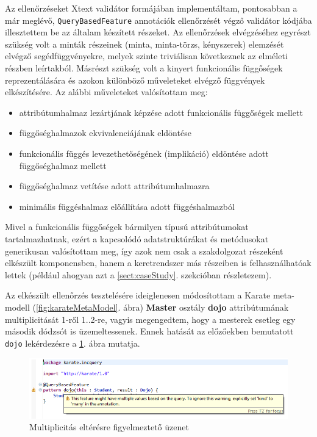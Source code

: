 Az ellenőrzéseket Xtext validátor formájában implementáltam, pontosabban a már meglévő, \texttt{QueryBasedFeature} annotációk ellenőrzését végző validátor kódjába illesztettem be az általam készített részeket.
Az ellenőrzések elvégzéséhez egyrészt szükség volt a minták részeinek (minta, minta-törzs, kényszerek) elemzését elvégző segédfüggvényekre, melyek szinte triviálisan következnek az elméleti részben leírtakból.
Másrészt szükség volt a kinyert funkcionális függőségek reprezentálására és azokon különböző műveleteket elvégző függvények elkészítésére.
Az alábbi műveleteket valósítottam meg:
\begin{itemize}
    \item attribútumhalmaz lezártjának képzése adott funkcionális függőségek mellett
    \item függőséghalmazok ekvivalenciájának eldöntése
    \item funkcionális függés levezethetőségének (implikáció) eldöntése adott függőséghalmaz mellett
    \item függőséghalmaz vetítése adott attribútumhalmazra
    \item minimális függéshalmaz előállítása adott függéshalmazból
\end{itemize}

Mivel a funkcionális függőségek bármilyen típusú attribútumokat tartalmazhatnak, ezért a kapcsolódó adatstruktúrákat és metódusokat generikusan valósítottam meg, így azok nem csak a szakdolgozat részeként elkészült komponensben, hanem a keretrendszer más részeiben is felhasználhatóak lettek (például ahogyan azt a \ref{sect:caseStudy}. szekcióban részletezem).

Az elkészült ellenőrzés tesztelésére ideiglenesen módosítottam a Karate meta-modell (\ref{fig:karateMetaModel}. ábra) \textbf{Master} osztály \textbf{dojo} attribútumának multiplicitását 1-ről 1..2-re, vagyis megengedtem, hogy a mesterek esetleg egy második dódzsót is üzemeltessenek.
Ennek hatását az előzőekben bemutatott \texttt{dojo} lekérdezésre a \ref{fig:funcDepManyWarning}. ábra mutatja.
\begin{figure}[htb]
\centering
\includegraphics[width=\textwidth]{figures/func-dep-many-warning.png}
\caption{Multiplicitás eltérésre figyelmeztető üzenet}
\label{fig:funcDepManyWarning}
\end{figure}

